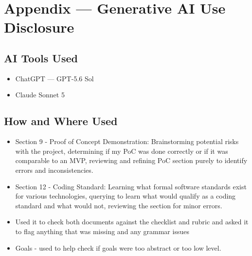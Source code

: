\documentclass{article}
\begin{document}
\newpage{}

\section{Appendix --- Generative AI Use Disclosure}



\subsection{AI Tools Used}

\begin{itemize}
    \item ChatGPT — GPT-5.6 Sol
    \item Claude Sonnet 5
\end{itemize}


\subsection{How and Where Used}




\begin{itemize}
    \item Section 9 - Proof of Concept Demonstration: Brainstorming potential
          risks with the project, determining if my PoC was done correctly or
          if it was comparable to an MVP, reviewing and refining PoC section
          purely to identify errors and inconsistencies.
    \item Section 12 - Coding Standard: Learning what formal software standards
          exist for various technologies, querying to learn what would qualify
          as a coding standard and what would not, reviewing the section for
          minor errors.
    \item Used it to check both documents against the checklist and rubric and
          asked it to flag anything that was missing and any grammar issues
    \item Goals - used to help check if goals were too abstract or too low
          level.
\end{itemize}
\end{document}

